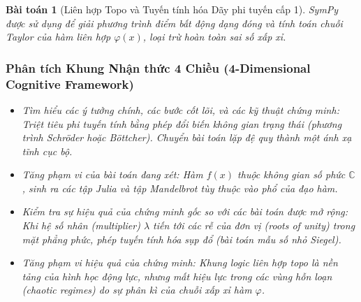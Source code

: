 \documentclass{article}
\newtheorem{baitoan}{Bài toán}
\begin{document}
\begin{baitoan}[Liên hợp Topo và Tuyến tính hóa Dãy phi tuyến cấp 1]
 \textsf{SymPy} được sử dụng để giải phương trình điểm bất động dạng đóng và tính toán chuỗi Taylor của hàm liên hợp $\varphi(x)$, loại trừ hoàn toàn sai số xấp xỉ.



 \subsubsection*{Phân tích Khung Nhận thức 4 Chiều (4-Dimensional Cognitive Framework)}
 \begin{itemize}
 \item \textit{Tìm hiểu các ý tưởng chính, các bước cốt lõi, và các kỹ thuật chứng minh}: Triệt tiêu phi tuyến tính bằng phép đổi biến không gian trạng thái (phương trình Schröder hoặc Böttcher). Chuyển bài toán lặp đệ quy thành một ánh xạ tĩnh cục bộ.
 \item \textit{Tăng phạm vi của bài toán đang xét}: Hàm $f(x)$ thuộc không gian số phức $\mathbb{C}$, sinh ra các tập Julia và tập Mandelbrot tùy thuộc vào phổ của đạo hàm.
 \item \textit{Kiểm tra sự hiệu quả của chứng minh gốc so với các bài toán được mở rộng}: Khi hệ số nhân (multiplier) $\lambda$ tiến tới các rễ của đơn vị (roots of unity) trong mặt phẳng phức, phép tuyến tính hóa sụp đổ (bài toán mẫu số nhỏ Siegel).
 \item \textit{Tăng phạm vi hiệu quả của chứng minh}: Khung logic liên hợp topo là nền tảng của hình học động lực, nhưng mất hiệu lực trong các vùng hỗn loạn (chaotic regimes) do sự phân kì của chuỗi xấp xỉ hàm $\varphi$.
 \end{itemize}
\end{baitoan}

\end{document}
